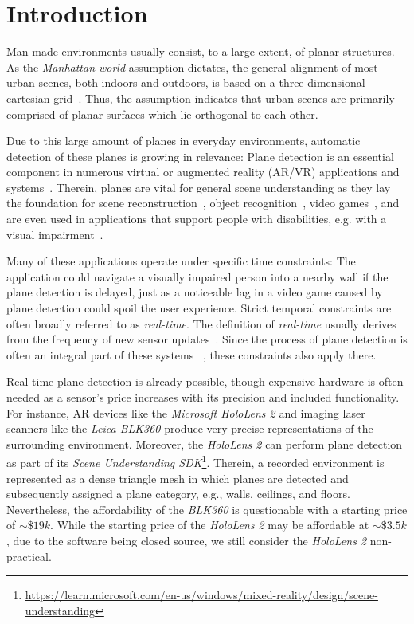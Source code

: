 \documentclass[main.tex]{subfiles}
\begin{document}
\chapter{Introduction}
\label{chap:Introduction}
\setcounter{page}{1}
Man-made environments usually consist, to a large extent, of planar structures.
As the \textit{Manhattan-world} assumption dictates, the general alignment of most urban scenes, both indoors and outdoors, is based on a three-dimensional cartesian grid~\cite{Coughlan_Yuille_1999}. Thus, the assumption indicates that urban scenes are primarily comprised of planar surfaces which lie orthogonal to each other.

Due to this large amount of planes in everyday environments, automatic detection of these planes is growing in relevance:
Plane detection is an essential component in numerous virtual or augmented reality (AR/VR) applications and systems~\cite{Jurado_Jurado_Ortega_Feito_2021, sridhar2020instant}.
Therein, planes are vital for general scene understanding as they lay the foundation for scene reconstruction~\cite{agarwala2022planeformers}, object recognition~\cite{Peternell_Steiner_2004, Qian_Ye_2014}, video games~\cite{ninja}, and are even used in applications that support people with disabilities, e.g. with a visual impairment~\cite{visimpaired, Schwarze_Lauer_Schwaab_Romanovas_Bohm_Jurgensohn_2015}.


Many of these applications operate under specific time constraints: The application could navigate a visually impaired person into a nearby wall if the plane detection is delayed, just as a noticeable lag in a video game caused by plane detection could spoil the user experience.
Strict temporal constraints are often broadly referred to as \textit{real-time}.
The definition of \textit{real-time} usually derives from the frequency of new sensor updates~\cite{Davison_2003}.
Since the process of plane detection is often an integral part of these systems ~\cite{Wang_Bu_Zhang_Cheng_2022, Dai_Lund_Gao_2022, Kaess_2015}, these constraints also apply there.

Real-time plane detection is already possible, though expensive hardware is often needed as a sensor's price increases
with its precision and included functionality.
For instance, AR devices like the \textit{Microsoft HoloLens 2} and imaging laser scanners like the \textit{Leica BLK360} produce very precise representations of the surrounding environment.
Moreover, the \textit{HoloLens 2} can perform plane detection as part of its \textit{Scene Understanding SDK}\footnote{\href{https://learn.microsoft.com/en-us/windows/mixed-reality/design/scene-understanding}{https://learn.microsoft.com/en-us/windows/mixed-reality/design/scene-understanding}}. Therein, a recorded environment is represented as a dense triangle mesh in which planes are detected and subsequently assigned a plane category, e.g., walls, ceilings, and floors.
Nevertheless, the affordability of the \textit{BLK360} is questionable with a starting price of ${\sim}\$19k$. While the starting price of the \textit{HoloLens 2} may be affordable at ${\sim}\$3.5k$, due to the software being closed source, we still consider the \textit{HoloLens 2} non-practical.
\end{document}
